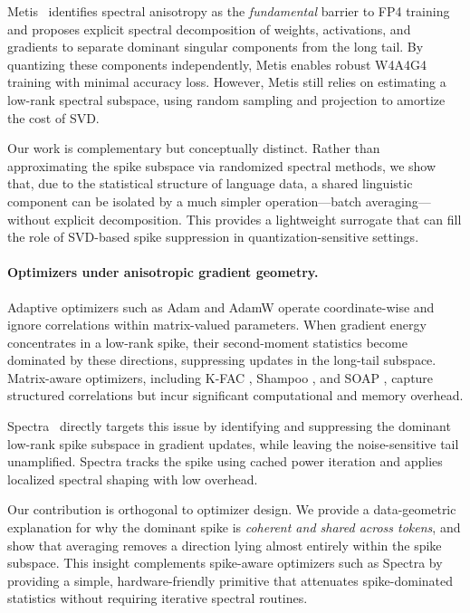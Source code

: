 Metis~\citep{cao2025metis} identifies spectral anisotropy as the \emph{fundamental}
barrier to FP4 training and proposes explicit spectral decomposition of weights,
activations, and gradients to separate dominant singular components from the
long tail.
By quantizing these components independently, Metis enables robust W4A4G4
training with minimal accuracy loss.
However, Metis still relies on estimating a low-rank spectral subspace, using
random sampling and projection to amortize the cost of SVD.

Our work is complementary but conceptually distinct.
Rather than approximating the spike subspace via randomized spectral methods,
we show that, due to the statistical structure of language data, a shared
linguistic component can be isolated by a much simpler operation—batch
averaging—without explicit decomposition.
This provides a lightweight surrogate that can fill the role of SVD-based spike
suppression in quantization-sensitive settings.

\paragraph{Optimizers under anisotropic gradient geometry.}
Adaptive optimizers such as Adam and AdamW \citep{kingma2014adam,loshchilov2017adamw}
operate coordinate-wise and ignore correlations within matrix-valued parameters.
When gradient energy concentrates in a low-rank spike, their second-moment
statistics become dominated by these directions, suppressing updates in the
long-tail subspace.
Matrix-aware optimizers, including K-FAC \citep{martens2015kfac}, Shampoo
\citep{gupta2018shampoo}, and SOAP \citep{vyas2024soap}, capture structured
correlations but incur significant computational and memory overhead.

Spectra~\citep{spectra2026} directly targets this issue by identifying and
suppressing the dominant low-rank spike subspace in gradient updates, while
leaving the noise-sensitive tail unamplified.
Spectra tracks the spike using cached power iteration and applies localized
spectral shaping with low overhead.

Our contribution is orthogonal to optimizer design.
We provide a data-geometric explanation for why the dominant spike is
\emph{coherent and shared across tokens}, and show that averaging removes a
direction lying almost entirely within the spike subspace.
This insight complements spike-aware optimizers such as Spectra by providing a
simple, hardware-friendly primitive that attenuates spike-dominated statistics
without requiring iterative spectral routines.

